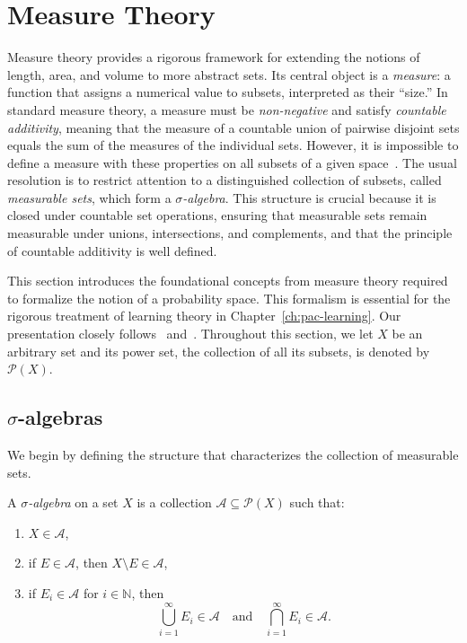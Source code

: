 \section{Measure Theory}\label{sec:measure-theory}

Measure theory provides a rigorous framework for extending the notions of length, area, and volume to more abstract sets. Its central object is a \emph{measure}: a function that assigns a numerical value to subsets, interpreted as their ``size.'' In standard measure theory, a measure must be \textit{non-negative} and satisfy \textit{countable additivity}, meaning that the measure of a countable union of pairwise disjoint sets equals the sum of the measures of the individual sets. However, it is impossible to define a measure with these properties on all subsets of a given space~\cite[Sec.~1.1]{MeasureTheoryTao}. The usual resolution is to restrict attention to a distinguished collection of subsets, called \emph{measurable sets}, which form a \emph{$\sigma$-algebra}. This structure is crucial because it is closed under countable set operations, ensuring that measurable sets remain measurable under unions, intersections, and complements, and that the principle of countable additivity is well defined.

This section introduces the foundational concepts from measure theory required to formalize the notion of a probability space. This formalism is essential for the rigorous treatment of learning theory in Chapter~\ref{ch:pac-learning}. Our presentation closely follows~\cite{MeasureTheoryCohn} and~\cite{MeasureTheoryLeGall}. Throughout this section, we let $X$ be an arbitrary set and its power set, the collection of all its subsets, is denoted by $\mathcal{P}(X)$.

\subsection{$\sigma$-algebras}

We begin by defining the structure that characterizes the collection of measurable sets.

\begin{definition}
    \label{def:sigma-algebra}
    A \emph{$\sigma$-algebra} on a set $X$ is a collection $\mathcal{A} \subseteq \mathcal{P}(X)$ such that:
    \begin{enumerate}[label=(\roman*)]
        \item $X \in \mathcal{A}$,
        \item if $E \in \mathcal{A}$, then $X \setminus E \in \mathcal{A}$,
        \item if $E_i \in \mathcal{A}$ for $i \in \mathbb{N}$, then
        \[
            \bigcup_{i=1}^\infty E_i \in \mathcal{A} \quad \text{and} \quad \bigcap_{i=1}^\infty E_i \in \mathcal{A}.
        \]
    \end{enumerate}
\end{definition}

